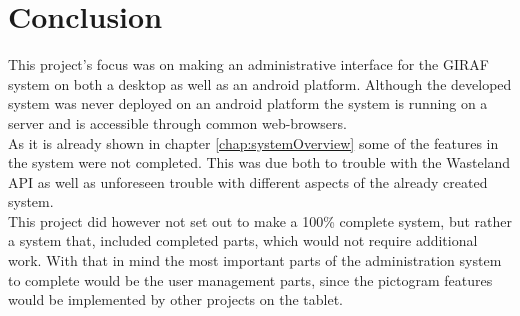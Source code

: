 \chapter{Conclusion}
\label{chap:conclusion}
This project's focus was on making an administrative interface for the GIRAF system on both a desktop as well as an android platform. Although the developed system was never deployed on an android platform the system is running on a server and is accessible through common web-browsers.\\
As it is already shown in chapter \vref{chap:systemOverview} some of the features in the system were not completed. This was due both to trouble with the Wasteland API as well as unforeseen trouble with different aspects of the already created system.\\
This project did however not set out to make a 100\% complete system, but rather a system that, included completed parts, which would not require additional work. With that in mind the most important parts of the administration system to complete would be the user management parts, since the pictogram features would be implemented by other projects on the tablet.\\

